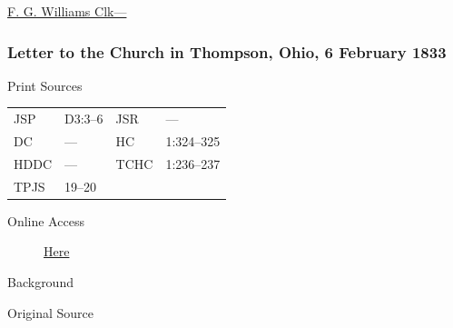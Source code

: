 				\begin{tightright}
				\uline{F. G. Williams Clk---}
				\end{tightright}
				
		\subsubsection{Letter to the Church in Thompson, Ohio, 6 February 1833}
			\label{EMS-1833-JS-6-FEB-1833}
		
			\begin{description}
				\item[Print Sources]
			\end{description}

				\begin{tabular}{p{0.5in}p{1in}p{0.5in}p{1in}}
				JSP	 	& D3:3--6		& JSR 		& --- \\
				DC	 	& --- 			& HC 		& 1:324--325 \\
				HDDC 	& ---			& TCHC 		& 1:236--237 \\
				TPJS 	& 19--20		& 	 		&  \\
				\end{tabular}
			
			\begin{description}
				\item[Online Access] \href{https://www.josephsmithpapers.org/paper-summary/letter-to-the-church-in-thompson-ohio-6-february-1833/1}{Here}
			\end{description}
			
			\begin{description}
				\item[Background]
			\end{description}
			
			
			\begin{description}
				\item[Original Source]
			\end{description}
			
